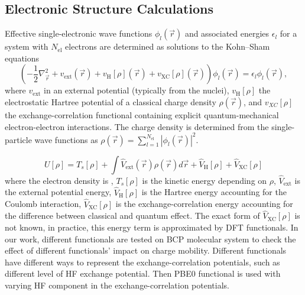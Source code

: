 \documentclass[letterpaper,12pt]{article}
\begin{document}
\subsection{Electronic Structure Calculations} 
Effective single-electronic wave functions $\phi_l (\vec{r})$ and associated energies $\epsilon_l$ for a system with $N_\text{el}$ electrons are determined as solutions to the Kohn--Sham equations~\cite{kohn_self_1965}
%
\begin{equation}
    \left(-\frac{1}{2}\nabla^2_{\vec{r}} + v_\text{ext}(\vec{r}) + v_\text{H}[\rho](\vec{r}) + v_\text{XC}[\rho](\vec{r})\right) \phi_l(\vec{r}) =  \epsilon_l \phi_l (\vec{r}) ,
    \label{eq:KS2}
\end{equation}
%
where $v_\text{ext}$ in an external potential (typically from the nuclei), $v_\text{H}[\rho]$ the electrostatic Hartree potential of a classical charge density $\rho(\vec{r})$, and $v_{XC}[\rho]$ the exchange-correlation functional containing explicit quantum-mechanical electron-electron interactions. The charge density is determined from the single-particle wave functions as $\rho(\vec{r})=\sum\limits_{l=1}^{N_\text{el}} \left\vert\phi_l(\vec{r})\right\vert^2$. 
 

%
\begin{equation}
    U[\rho] = T_s[\rho] + \int \hat{V}_\text{ext}(\vec{r}) \rho(\vec{r}) d \vec{r} + \hat{V}_\text{H}[\rho] + \hat{V}_\text{XC}[\rho]
    \label{eq:KS_model}
\end{equation}
%
where the electron density is , $T_s[\rho]$ is the kinetic energy depending on $\rho$,  $\hat{V}_\text{ext}$ is the external potential energy,  $\hat{V}_\text{H}[\rho]$ is the Hartree energy accounting for the Coulomb interaction, $\hat{V}_\text{XC}[\rho]$ is the exchange-correlation energy accounting for the difference between classical and quantum effect. The exact form of $\hat{V}_\text{XC}[\rho]$ is not known, in practice, this energy term is approximated by DFT functionals. In our work, different functionals are tested on BCP molecular system to check the effect of different functionals' impact on charge mobility. Different functionals have different ways to represent the exchange-correlation potentials, such as different level of HF exchange potential. 
Then PBE0 functional is used with varying HF component in the exchange-correlation potentials. 
\end{document}
